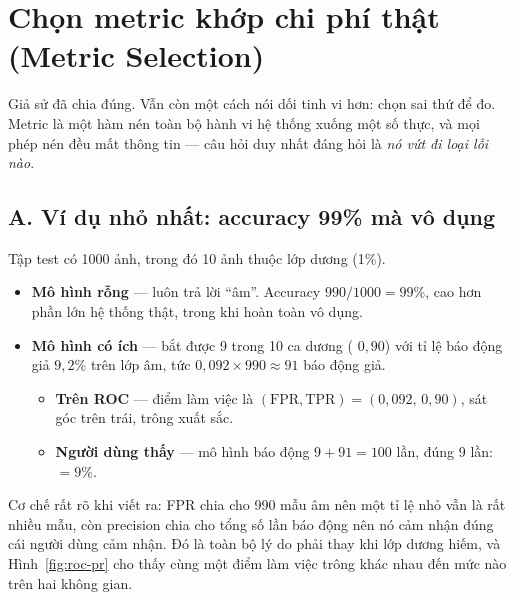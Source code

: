 \documentclass[../../deep_learning.tex]{subfiles}
\begin{document}
\section{Chọn metric khớp chi phí thật (Metric Selection)}
Giả sử đã chia đúng. Vẫn còn một cách nói dối tinh vi hơn: chọn sai thứ để đo. Metric là một hàm nén toàn bộ hành vi hệ thống xuống một số thực, và mọi phép nén đều mất thông tin --- câu hỏi duy nhất đáng hỏi là \emph{nó vứt đi loại lỗi nào}.

\subsection{A. Ví dụ nhỏ nhất: accuracy 99\%
mà vô dụng}
Tập test có 1000 ảnh, trong đó 10 ảnh thuộc lớp dương (1\%).
\begin{itemize}
\item \textbf{Mô hình rỗng} --- luôn trả lời ``âm''. Accuracy \(990/1000 = 99\%
\), cao hơn phần lớn hệ thống thật, trong khi hoàn toàn vô dụng.
\item \textbf{Mô hình có ích} --- bắt được 9 trong 10 ca dương ( \(0{,}90\)) với tỉ lệ báo động giả \(9{,}2\%
\) trên lớp âm, tức \(0{,}092 \times 990 \approx 91\) báo động giả.
  \begin{itemize}
  \item \textbf{Trên ROC} --- điểm làm việc là \((\text{FPR},\text{TPR}) = (0{,}092,\,0{,}90)\), sát góc trên trái, trông xuất sắc.
  \item \textbf{Người dùng thấy} --- mô hình báo động \(9+91 = 100\) lần, đúng 9 lần:  \(= 9\%
\).
  \end{itemize}
\end{itemize}
Cơ chế rất rõ khi viết ra: FPR chia cho 990 mẫu âm nên một tỉ lệ nhỏ vẫn là rất nhiều mẫu, còn precision chia cho tổng số lần báo động nên nó cảm nhận đúng cái người dùng cảm nhận. Đó là toàn bộ lý do  phải thay  khi lớp dương hiếm, và Hình~\ref{fig:roc-pr} cho thấy cùng một điểm làm việc trông khác nhau đến mức nào trên hai không gian.
\end{document}
